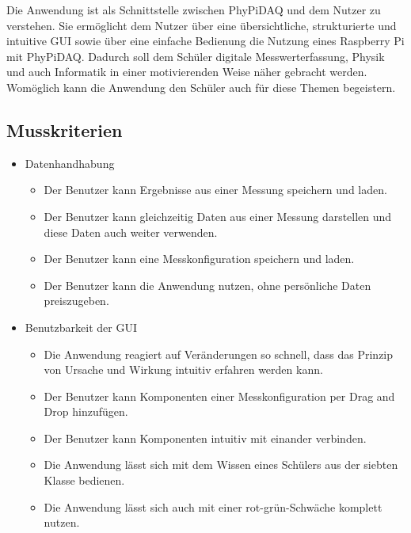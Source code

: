 \documentclass[parskip=full]{scrartcl}
\begin{document}
Die Anwendung ist als Schnittstelle zwischen PhyPiDAQ und dem Nutzer zu verstehen. Sie ermöglicht dem Nutzer über eine übersichtliche, strukturierte und intuitive GUI sowie über eine einfache Bedienung die Nutzung eines Raspberry Pi mit PhyPiDAQ. Dadurch soll dem Schüler digitale Messwerterfassung, Physik und auch Informatik in einer motivierenden Weise näher gebracht werden. Womöglich kann die Anwendung den Schüler auch für diese Themen begeistern.  

\subsection{Musskriterien}

\begin{itemize}

\item Datenhandhabung
\begin{itemize}

\item Der Benutzer kann Ergebnisse aus einer Messung speichern und laden.
\item Der Benutzer kann gleichzeitig Daten aus einer Messung darstellen und diese Daten auch weiter verwenden.
\item Der Benutzer kann eine Messkonfiguration speichern und laden.
\item Der Benutzer kann die Anwendung nutzen, ohne persönliche Daten preiszugeben.

\end{itemize}



\item Benutzbarkeit der GUI
\begin{itemize}

\item Die Anwendung reagiert auf Veränderungen so schnell, dass das Prinzip von Ursache und Wirkung intuitiv erfahren werden kann.
\item Der Benutzer kann Komponenten einer Messkonfiguration per Drag and Drop hinzufügen.
\item Der Benutzer kann Komponenten intuitiv mit einander verbinden.
\item Die Anwendung lässt sich mit dem Wissen eines Schülers aus der siebten Klasse bedienen.
\item Die Anwendung lässt sich auch mit einer rot-grün-Schwäche komplett nutzen.

\end{itemize}


\end{itemize}
\end{document}

